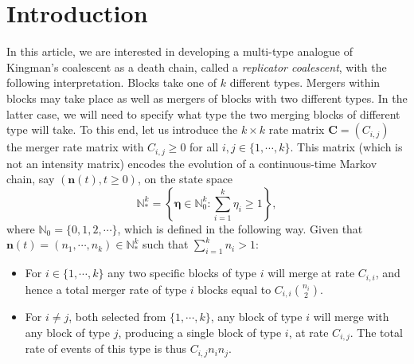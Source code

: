 \documentclass[12pt, leqno]{article}
\begin{document}
\section{Introduction} 
In this article, we are interested in developing a multi-type analogue of Kingman's coalescent as a death chain, called a {\it replicator coalescent}, with the following interpretation. Blocks take one of $k$ different types. Mergers within blocks may take place as well as mergers of blocks with two different types. In the latter case, we will need to specify what type the two merging blocks of different type will take.  To this end, let us introduce the $k\times k$ rate matrix $\bm C = (C_{i,j})$ the merger rate matrix with $C_{i,j}\geq 0$ for all $i,j\in\{1,\cdots, k\}$. This matrix (which is not an intensity matrix) encodes the evolution of a continuous-time Markov chain, say $({\bm n}(t), t\geq0) $, on the state space
\[
\mathbb{N}^k_* = \left\{\bm \eta \in \mathbb{N}^k_0: \sum_{i=1}^k\eta_i\geq 1\right\},
\]
 where $\mathbb{N}_0 = \{0,1,2, \cdots\}$, 
 which is defined in the following way. 
 Given that ${\bm n}(t) = (n_1  , \cdots,  n_k )\in \mathbb{N}^k_*$ such that $\sum_{i =1}^k n_i > 1$:
\begin{itemize}
\item For $i\in\{1,\cdots,k\}$ any two specific blocks of type $i$ will merge at rate $C_{i,i}$, and hence a total merger rate of type $i$ blocks equal to 
$
C_{i,i}{n_i  \choose 2}.
$
\medskip

\item For $i\neq j$, both selected from  $\{1,\cdots, k\}$, any block of type $i$ will merge with any block of type $j$, producing a single block of type $i$, at rate $C_{i, j}$. The total rate of events of this type is thus $C_{i,j} n_in_j$.%
\end{itemize}

\medskip
\end{document}

